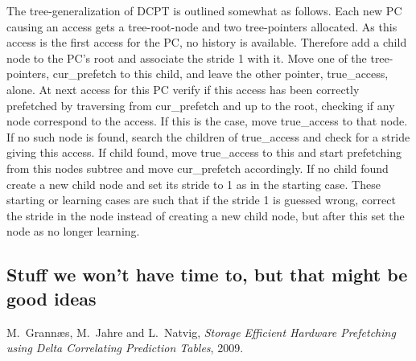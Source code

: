 \documentclass[12pt,journal,compsoc]{IEEEtran}
\begin{document}
The tree-generalization of DCPT is outlined somewhat as follows. Each new PC
causing an access gets a tree-root-node and two tree-pointers allocated.
As this access is the first access for the PC, no history is available.
Therefore add a child node to the PC's root and associate the stride 1 with it.
Move one of the tree-pointers, cur\_prefetch to this child, and leave the other
pointer, true\_access, alone. At next access for this PC verify if this access
has been correctly prefetched by traversing from cur\_prefetch and up to the
root, checking if any node correspond to the access. If this is the case,
move true\_access to that node. If no such node is found, search the children
of true\_access and check for a stride giving this access. If child found, move
true\_access to this and start prefetching from this nodes subtree and move
cur\_prefetch accordingly. If no child found create a new child node and set
its stride to 1 as in the starting case. These starting or learning cases
are such that if the stride 1 is guessed wrong, correct the stride in the node
instead of creating a new child node, but after this set the node as no longer
learning.

\subsection{Stuff we won't have time to, but that might be good ideas}




\ifCLASSOPTIONcompsoc
\else
\fi


\ifCLASSOPTIONcaptionsoff
  \newpage
\fi



\begin{thebibliography}{1}

M.~Grann\ae s, M.~Jahre and L.~Natvig, \emph{Storage Efficient Hardware Prefetching using Delta Correlating Prediction Tables}, 2009.

\end{thebibliography}



\end{document}
